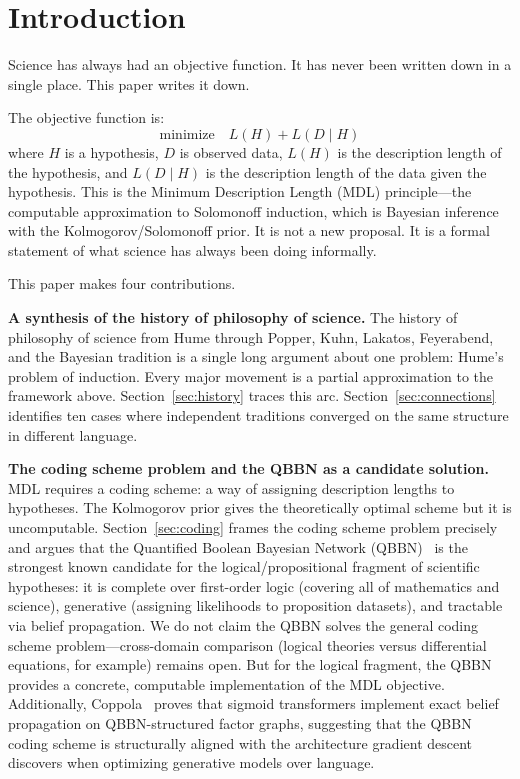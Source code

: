 \section{Introduction}
\label{sec:introduction}

Science has always had an objective function. It has never been written
down in a single place. This paper writes it down.

The objective function is:
\[
  \text{minimize} \quad L(H) + L(D \mid H)
\]
where $H$ is a hypothesis, $D$ is observed data, $L(H)$ is the
description length of the hypothesis, and $L(D \mid H)$ is the
description length of the data given the hypothesis. This is the
Minimum Description Length (MDL) principle---the computable
approximation to Solomonoff induction, which is Bayesian inference
with the Kolmogorov/Solomonoff prior. It is not a new proposal. It is
a formal statement of what science has always been doing informally.

This paper makes four contributions.

\textbf{A synthesis of the history of philosophy of science.} The
history of philosophy of science from Hume through Popper, Kuhn,
Lakatos, Feyerabend, and the Bayesian tradition is a single long
argument about one problem: Hume's problem of induction. Every major
movement is a partial approximation to the framework above.
Section~\ref{sec:history} traces this arc.
Section~\ref{sec:connections} identifies ten cases where independent
traditions converged on the same structure in different language.

\textbf{The coding scheme problem and the QBBN as a candidate
solution.} MDL requires a coding scheme: a way of assigning description
lengths to hypotheses. The Kolmogorov prior gives the theoretically
optimal scheme but it is uncomputable. Section~\ref{sec:coding} frames
the coding scheme problem precisely and argues that the Quantified
Boolean Bayesian Network (QBBN)~\cite{coppola2024qbbn} is the
strongest known candidate for the logical/propositional fragment of
scientific hypotheses: it is complete over first-order logic (covering
all of mathematics and science), generative (assigning likelihoods to
proposition datasets), and tractable via belief propagation. We do not
claim the QBBN solves the general coding scheme problem---cross-domain
comparison (logical theories versus differential equations, for
example) remains open. But for the logical fragment, the QBBN provides
a concrete, computable implementation of the MDL objective.
Additionally, Coppola~\cite{coppola2026} proves that sigmoid
transformers implement exact belief propagation on QBBN-structured
factor graphs, suggesting that the QBBN coding scheme is structurally
aligned with the architecture gradient descent discovers when
optimizing generative models over language.

